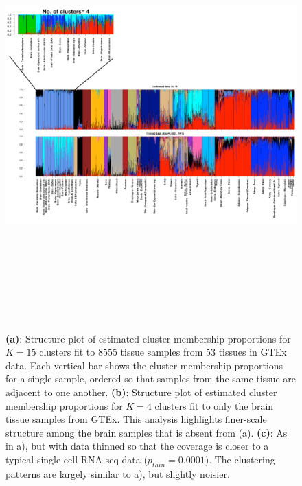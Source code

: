 

\begin{figure}
\raggedleft
\includegraphics[height=6.5in, width=9.5in]{../plots/gtex-figures/gtex.pdf}
 \caption{ \textbf{(a)}: Structure plot of estimated cluster membership proportions for $K=15$ clusters fit to $8555$ tissue samples from $53$ tissues in GTEx data.  Each vertical bar shows the cluster membership proportions for a single sample, ordered so that samples from the same tissue are adjacent to one another. \textbf{(b)}: Structure plot of estimated cluster membership proportions for $K=4$ clusters fit to only the brain tissue samples from GTEx. This analysis highlights finer-scale structure among the brain samples that is absent from (a).  \textbf{(c)}: As in a), but with data thinned so that the coverage is closer to a typical single cell RNA-seq data ($p_{thin}=0.0001$).  The clustering patterns are largely similar to a), but slightly noisier.}
\label{fig:fig1}
\end{figure}
